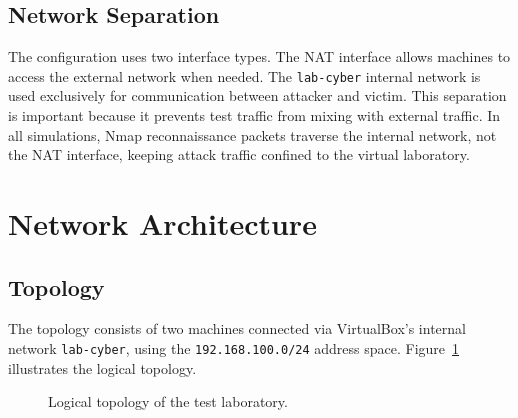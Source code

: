 \documentclass[12pt,a4paper]{report}
\begin{document}
\subsection{Network Separation}

The configuration uses two interface types. The NAT interface allows machines to access the external network when needed. The \texttt{lab-cyber} internal network is used exclusively for communication between attacker and victim. This separation is important because it prevents test traffic from mixing with external traffic. In all simulations, Nmap reconnaissance packets traverse the internal network, not the NAT interface, keeping attack traffic confined to the virtual laboratory.

\section{Network Architecture}

\subsection{Topology}

The topology consists of two machines connected via VirtualBox's internal network \texttt{lab-cyber}, using the \texttt{192.168.100.0/24} address space. Figure~\ref{fig:topologie-logique} illustrates the logical topology.

\begin{figure}[H]
\centering
{}
\caption{Logical topology of the test laboratory.}
\label{fig:topologie-logique}
\end{figure}
\end{document}
